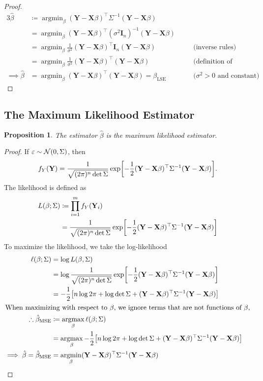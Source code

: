 \documentclass[letterpaper, reqno]{amsart}
\newtheorem{prop}{Proposition}[section]
\numberwithin{equation}{section}
\newcommand{\T}{\top} %
\newcommand{\vect}[1]{\boldsymbol{\mathbf{#1}}} %
\newcommand{\N}[2]{\mathcal{N}\mleft( #1, #2 \mright)}
\newcommand{\by}[1]{&\quad&\text{(#1)}}
\newcommand{\Xm}{\vect{X}}
\newcommand{\Yv}{\vect{Y}}
\newcommand{\Bv}{\beta}
\newcommand{\Bvh}{\hat{\beta}}
\newcommand{\ve}{\varepsilon}
\DeclareMathOperator*{\argmin}{argmin}
\DeclareMathOperator*{\argmax}{argmax}
\begin{document}
\begin{proof}
  \begin{alignat*}{3}
    \Bvh &\coloneqq \argmin_\Bv (\Yv - \Xm\Bv)^\T \Sigma^{-1} (\Yv - \Xm\Bv) \\
         &= \argmin_\Bv (\Yv - \Xm\Bv)^\T (\sigma^2 \vect{I}_n)^{-1} (\Yv - \Xm\Bv) \\
         &= \argmin_\Bv \frac{1}{\sigma^2} (\Yv - \Xm\Bv)^\T \vect{I}_n (\Yv - \Xm\Bv) \by{inverse rules} \\
         &= \argmin_\Bv \frac{1}{\sigma^2} (\Yv - \Xm\Bv)^\T (\Yv - \Xm\Bv) \by{definition of identity} \\
    \implies \Bvh &= \argmin_\Bv (\Yv - \Xm\Bv)^\T (\Yv - \Xm\Bv) = \beta_\mathrm{LSE} \by{$\sigma^2 > 0$ and constant} \tag*{\qedhere}
  \end{alignat*}
\end{proof}

\subsection{The Maximum Likelihood Estimator}
\begin{prop}
  The estimator $\Bvh$ is the maximum likelihood estimator.
\end{prop}

\begin{proof}
  If $\ve \sim \N{0}{\Sigma}$, then
  \[ f_Y(\Yv) = \frac{1}{\sqrt{(2\pi)^n \det \Sigma}}
      \exp \mleft[-\frac{1}{2} (\Yv - \Xm\Bv)^\T \Sigma^{-1} (\Yv - \Xm\Bv) \mright]. \]
  The likelihood is defined as
  \begin{align*}
    L(\Bv; \Sigma) &\coloneqq \prod_{i=1}^m f_Y(\Yv_i)  \\
    &= \frac{1}{\sqrt{(2\pi)^n \det \Sigma}}
      \exp \mleft[-\frac{1}{2} (\Yv - \Xm\Bv)^\T \Sigma^{-1} (\Yv - \Xm\Bv) \mright]
  \end{align*}
  To maximize the likelihood, we take the log-likelihood
  \begin{align*}
    \ell(\Bv; \Sigma) &= \log L(\Bv, \Sigma) \\
    &= \log \frac{1}{\sqrt{(2\pi)^n \det \Sigma}}
      \exp \mleft[-\frac{1}{2} (\Yv - \Xm\Bv)^\T \Sigma^{-1} (\Yv - \Xm\Bv) \mright] \\
    &= -\frac{1}{2} \mleft[n \log 2\pi + \log \det \Sigma 
        + (\Yv - \Xm\Bv)^\T \Sigma^{-1} (\Yv - \Xm\Bv) \mright] \\
    \intertext{When maximizing with respect to $\Bv$, we ignore terms that are
      not functions of $\Bv$,}
    \therefore \Bvh_\mathrm{MSE} &\coloneqq \argmax_\Bv \ell(\Bv; \Sigma) \\
    &= \argmax_\Bv -\frac{1}{2} \mleft[n \log 2\pi + \log \det \Sigma 
        + (\Yv - \Xm\Bv)^\T \Sigma^{-1} (\Yv - \Xm\Bv) \mright] \\
    \implies \Bvh = \Bvh_\mathrm{MSE} &= \argmin_\Bv (\Yv - \Xm\Bv)^\T \Sigma^{-1} (\Yv - \Xm\Bv)   \qedhere
  \end{align*}
\end{proof}
\end{document}
